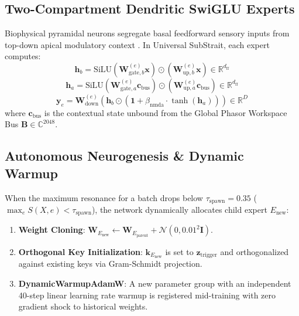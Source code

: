 \documentclass[10pt,twocolumn,letterpaper]{article}
\begin{document}
\subsection{Two-Compartment Dendritic SwiGLU Experts}
Biophysical pyramidal neurons segregate basal feedforward sensory inputs from top-down apical modulatory context \cite{larkum1999, poirazi2003}. In Universal SubStrait, each expert computes:
\begin{equation}
\mathbf{h}_b = \text{SiLU}(\mathbf{W}_{\text{gate}, b}^{(e)} \mathbf{x}) \odot (\mathbf{W}_{\text{up}, b}^{(e)} \mathbf{x}) \in \mathbb{R}^{d_{\text{ff}}}
\end{equation}
\begin{equation}
\mathbf{h}_a = \text{SiLU}(\mathbf{W}_{\text{gate}, a}^{(e)} \mathbf{c}_{\text{bus}}) \odot (\mathbf{W}_{\text{up}, a}^{(e)} \mathbf{c}_{\text{bus}}) \in \mathbb{R}^{d_{\text{ff}}}
\end{equation}
\begin{equation}
\mathbf{y}_e = \mathbf{W}_{\text{down}}^{(e)} \left( \mathbf{h}_b \odot \left( \mathbf{1} + \beta_{\text{nmda}} \cdot \tanh(\mathbf{h}_a) \right) \right) \in \mathbb{R}^D
\end{equation}
where $\mathbf{c}_{\text{bus}}$ is the contextual state unbound from the Global Phasor Workspace Bus $\mathbf{B} \in \mathbb{C}^{2048}$.

\subsection{Autonomous Neurogenesis \& Dynamic Warmup}
When the maximum resonance for a batch drops below $\tau_{\text{spawn}} = 0.35$ ($\max_e S(X, e) < \tau_{\text{spawn}}$), the network dynamically allocates child expert $E_{\text{new}}$:
\begin{enumerate}
    \item \textbf{Weight Cloning}: $\mathbf{W}_{E_{\text{new}}} \leftarrow \mathbf{W}_{E_{\text{parent}}} + \mathcal{N}(0, 0.01^2 \mathbf{I})$.
    \item \textbf{Orthogonal Key Initialization}: $\mathbf{k}_{E_{\text{new}}}$ is set to $\mathbf{z}_{\text{trigger}}$ and orthogonalized against existing keys via Gram-Schmidt projection.
    \item \textbf{DynamicWarmupAdamW}: A new parameter group with an independent 40-step linear learning rate warmup is registered mid-training with zero gradient shock to historical weights.
\end{enumerate}
\end{document}
